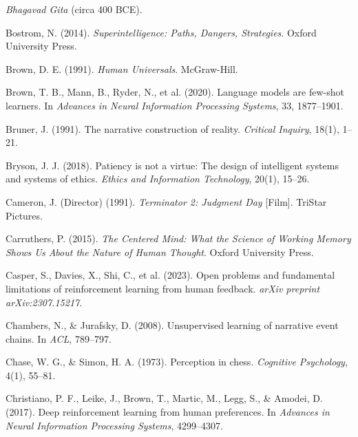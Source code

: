 \documentclass[12pt]{article}
\begin{document}
\begin{thebibliography}{99}
\textit{Bhagavad Gita} (circa 400 BCE).

Bostrom, N. (2014).
\newblock \textit{Superintelligence: Paths, Dangers, Strategies}.
\newblock Oxford University Press.

Brown, D. E. (1991).
\newblock \textit{Human Universals}.
\newblock McGraw-Hill.

Brown, T. B., Mann, B., Ryder, N., et al. (2020).
\newblock Language models are few-shot learners.
\newblock In \textit{Advances in Neural Information Processing Systems}, 33, 1877--1901.

Bruner, J. (1991).
\newblock The narrative construction of reality.
\newblock \textit{Critical Inquiry}, 18(1), 1--21.

Bryson, J. J. (2018).
\newblock Patiency is not a virtue: The design of intelligent systems and systems of ethics.
\newblock \textit{Ethics and Information Technology}, 20(1), 15--26.

Cameron, J. (Director) (1991).
\newblock \textit{Terminator 2: Judgment Day} [Film].
\newblock TriStar Pictures.

Carruthers, P. (2015).
\newblock \textit{The Centered Mind: What the Science of Working Memory Shows Us About the Nature of Human Thought}.
\newblock Oxford University Press.

Casper, S., Davies, X., Shi, C., et al. (2023).
\newblock Open problems and fundamental limitations of reinforcement learning from human feedback.
\newblock \textit{arXiv preprint arXiv:2307.15217}.

Chambers, N., \& Jurafsky, D. (2008).
\newblock Unsupervised learning of narrative event chains.
\newblock In \textit{ACL}, 789--797.

Chase, W. G., \& Simon, H. A. (1973).
\newblock Perception in chess.
\newblock \textit{Cognitive Psychology}, 4(1), 55--81.

Christiano, P. F., Leike, J., Brown, T., Martic, M., Legg, S., \& Amodei, D. (2017).
\newblock Deep reinforcement learning from human preferences.
\newblock In \textit{Advances in Neural Information Processing Systems}, 4299--4307.


\end{thebibliography}
\end{document}
